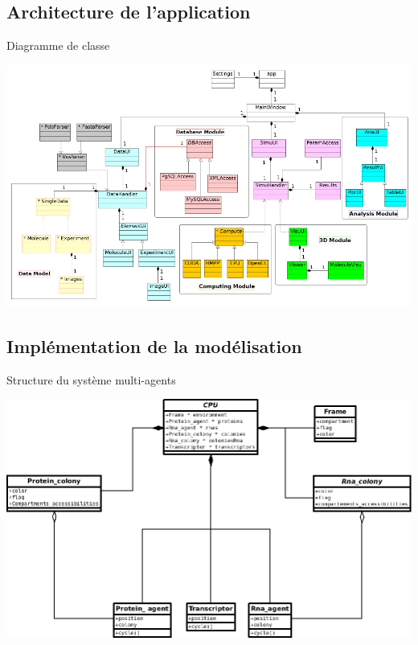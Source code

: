 \documentclass{beamer}
\begin{document}
\subsection{Architecture de l'application}

\begin{frame}

  \begin{block}{Diagramme de classe}
  \begin{center}
      \includegraphics[width=1\columnwidth]{img/diag.png}
  \end{center}
  \end{block}

\end{frame}



\subsection{Implémentation de la modélisation}

\begin{frame}
  \begin{block}{Structure du système multi-agents}
  \begin{center}
    \includegraphics[width=1\columnwidth]{img/diag_SMA.png}
  \end{center}
  \end{block}
\end{frame}
\end{document}
